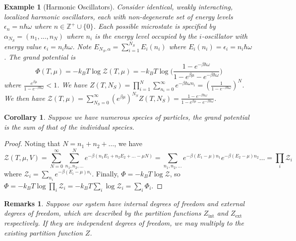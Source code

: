 \documentclass[a4paper]{article}
\newtheorem{eg}{Example}[section]
\newtheorem{remarks}{Remarks}[section]
\theoremstyle{new}
\newtheorem{cor}{Corollary}[section]
\begin{document}
\begin{eg}[Harmonic Oscillators]
Consider identical, weakly interacting, localized harmonic oscillators, each with non-degenerate set of energy levels $\epsilon_n=n\hbar\omega$ where $n\in\mathbb{Z}^+\cup\{0\}$. Each possible microstate is specified by $\alpha_{N_S}=(n_1,...,n_N)$ where $n_i$ is the energy level occupied by the $i$-oscillator with energy value $\epsilon_i=n_i\hbar\omega$. Note $E_{N_S,\alpha}=\sum_{i=1}^{N_S}E_i(n_i)$ where $E_i(n_i)=\epsilon_i=n_i\hbar\omega$. The grand potential is
$$\Phi(T,\mu)=-k_BT\log\mathcal{Z}(T,\mu)=-k_BT\log\bigg(\frac{1-e^{-\beta\hbar\omega}}{1-e^{\beta\mu}-e^{-\beta\hbar\omega}}\bigg)$$
where $\frac{e^{\beta\mu}}{1-e^{-\beta\hbar\omega}}<1$. We have $Z(T,N_S)=\prod_{i=1}^N\sum_{n_i=0}^\infty e^{-\beta\hbar\omega n_i}=(\frac{1}{1-e^{-\beta\hbar\omega}})^N$. We then have $\mathcal{Z}(T,\mu)=\sum_{N_S=0}^\infty (e^{\beta\mu})^{N_S}Z(T,N_S)=\frac{1-e^{-\beta\hbar\omega}}{1-e^{\beta\mu}-e^{-\beta\hbar\omega}}$.
\end{eg}
\begin{cor}
Suppose we have numerous species of particles, the grand potential is the sum of that of the individual species.
\end{cor}
\begin{proof}
Noting that $N=n_1+n_2+\dots$, we have
$$\mathcal{Z}(T,\mu,V)=\sum_{N=0}^\infty\sum_{n_1,n_2,\dots}^Ne^{-\beta(n_1E_1+n_2E_2+\dots-\mu N)}=\sum_{n_1,n_2,\dots}e^{-\beta(E_1-\mu)n_1}e^{-\beta(E_2-\mu)n_2}\dots=\prod_i\mathcal{Z}_i$$
where $\mathcal{Z}_i=\sum_{n_i}e^{-\beta(E_i-\mu)n_i}$. Finally, $\Phi=-k_BT\log\mathcal{Z}$, so $\Phi=-k_BT\log\prod_i\mathcal{Z}_i=-k_BT\sum_i\log\mathcal{Z}_i=\sum_i\Phi_i$.
\end{proof}
\begin{remarks}
Suppose our system have internal degrees of freedom and external degrees of freedom, which are described by the partition functions $Z_{\text{int}}$ and $Z_{\text{ext}}$ respectively. If they are independent degrees of freedom, we may multiply to the existing partition function $Z$.
\end{remarks}
\end{document}
